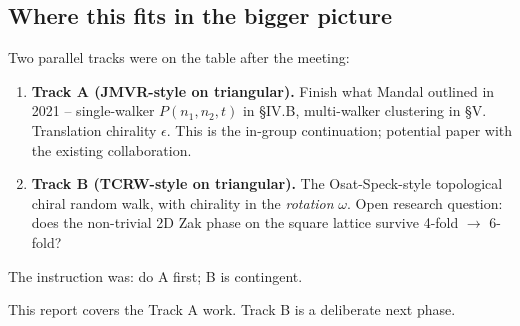 \documentclass[11pt,a4paper]{article}
\begin{document}
\subsection{Where this fits in the bigger picture}\label{ssec:big-picture}

Two parallel tracks were on the table after the meeting:
\begin{enumerate}[leftmargin=*]
\item \textbf{Track A (JMVR-style on triangular).} Finish what Mandal
  outlined in 2021 -- single-walker $P(n_1, n_2, t)$ in §IV.B,
  multi-walker clustering in §V. Translation chirality $\epsilon$. This
  is the in-group continuation; potential paper with the existing
  collaboration.
\item \textbf{Track B (TCRW-style on triangular).} The Osat-Speck-style
  topological chiral random walk, with chirality in the \emph{rotation}
  $\omega$. Open research question: does the non-trivial 2D Zak phase
  on the square lattice survive 4-fold $\to$ 6-fold?
\end{enumerate}
The instruction was: do A first; B is contingent.

This report covers the Track A work. Track B is a deliberate next phase.

\begin{center}
\end{center}
\end{document}
